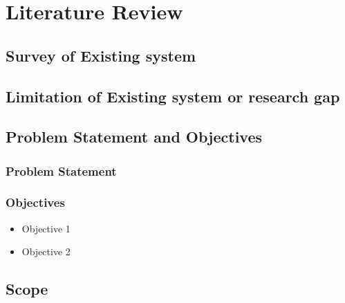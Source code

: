 \chapter{Literature Review}

\section{Survey of Existing system} 
\blindtext \cite{doe2021impact}  %

\section{Limitation of Existing system or research gap }
\blindtext 

\section{Problem Statement and Objectives }
\subsection*{Problem Statement}
\blindtext

\subsection*{Objectives}
\begin{itemize}
    \item Objective 1
    \item Objective 2
\end{itemize}

\section{Scope}
\blindtext
